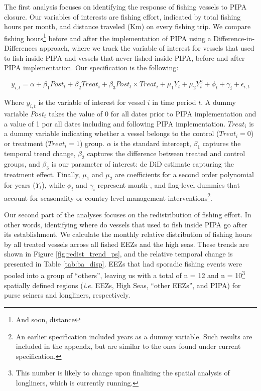 \documentclass[12pt,]{article}
\let\rmarkdownfootnote\footnote%
\def\footnote{\protect\rmarkdownfootnote}
\begin{document}
The first analysis focuses on identifying the response of fishing
vessels to PIPA closure. Our variables of interests are fishing effort,
indicated by total fishing hours per month, and distance traveled (Km)
on every fishing trip. We compare fishing hours\footnote{And soon,
  distance} before and after the implementation of PIPA using a
Difference-in-Differences approach, where we track the variable of
interest for vessels that used to fish inside PIPA and vessels that
never fished inside PIPA, before and after PIPA implementation. Our
specification is the following:

\[
y_{i,t} = \alpha + \beta_1 Post_t + \beta_2 Treat_i + \beta_3 Post_t \times Treat_i + \mu_1Y_t + \mu_2Y_t^2 + \phi_t + \gamma_i + \epsilon_{i,t}
\]

Where \(y_{i,t}\) is the variable of interest for vessel \(i\) in time
period \(t\). A dummy variable \(Post_t\) takes the value of 0 for all
dates prior to PIPA implementation and a value of 1 por all dates
including and following PIPA implementation. \(Treat_i\) is a dummy
variable indicating whether a vessel belongs to the control
(\(Treat_i = 0\)) or treatment (\(Treat_i = 1\)) group. \(\alpha\) is
the standard intercept, \(\beta_1\) captures the temporal trend change,
\(\beta_2\) captures the difference between treated and control groups,
and \(\beta_3\) is our parameter of interest: de DiD estimate capturing
the treatment effect. Finally, \(\mu_1\) and \(\mu_2\) are coefficients
for a second order polynomial for years (\(Y_t\)), while \(\phi_t\) and
\(\gamma_i\) represent month-, and flag-level dummies that account for
seasonality or country-level management interventions\footnote{An
  earlier specification included years as a dummy variable. Such results
  are included in the appendx, but are similar to the ones found under
  current specification.}.

Our second part of the analyses focuses on the redistribution of fishing
effort. In other words, identifying where do vessels that used to fish
inside PIPA go after its establishment. We calculate the monthly
relative distribution of fishing hours by all treated vessels across all
fished EEZs and the high seas. These trends are shown in Figure
\ref{fig:redist_trend_ps}, and the relative temporal change is presented
in Table \ref{tab:ba_disp}. EEZs that had sporadic fishing events were
pooled into a group of ``others'', leaving us with a total of n = 12 and
n = 10\footnote{This number is likely to change upon finalizing the
  spatial analysis of longliners, which is currently running.} spatially
defined regions (\emph{i.e.} EEZs, High Seas, ``other EEZs'', and PIPA)
for purse seiners and longliners, respectively.
\end{document}
